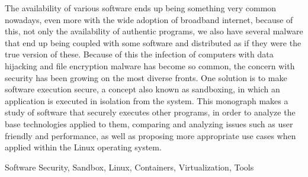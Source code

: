 The availability of various software ends up being something very common nowadays, even more with the wide adoption of broadband internet, because of this, not only the availability of authentic programs, we also have several malware that end up being coupled with some software and distributed as if they were the true version of these. Because of this the infection of computers with data hijacking and file encryption malware has become so common, the concern with security has been growing on the most diverse fronts. One solution is to make software execution secure, a concept also known as sandboxing, in which an application is executed in isolation from the system. This monograph makes a study of software that securely executes other programs, in order to analyze the base technologies applied to them, comparing and analyzing issues such as user friendly and performance, as well as proposing more appropriate use cases when applied within the Linux operating system.


\begin{keywords}
Software Security, Sandbox, Linux, Containers, Virtualization, Tools
\end{keywords}